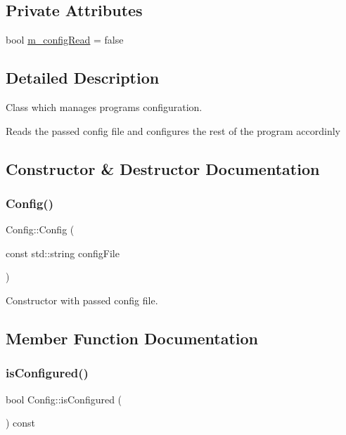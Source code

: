 \subsection*{Private Attributes}
\begin{DoxyCompactItemize}
\item 
bool \hyperlink{class_config_a82bcc998ae058699369aee4a189f0ad1}{m\+\_\+config\+Read} = false
\end{DoxyCompactItemize}


\subsection{Detailed Description}
Class which manages programs configuration. 

Reads the passed config file and configures the rest of the program accordinly 

\subsection{Constructor \& Destructor Documentation}
\mbox{\label{class_config_af8b0e9dc72b16b73ebb32d177fb93e1b}} 
\subsubsection{\texorpdfstring{Config()}{Config()}}
{\footnotesize\ttfamily Config\+::\+Config (\begin{DoxyParamCaption}\item[{const std\+::string}]{config\+File }\end{DoxyParamCaption})}



Constructor with passed config file. 



\subsection{Member Function Documentation}
\mbox{\label{class_config_a47870f3f5bc52f5d0aa387c25e431055}} 
\subsubsection{\texorpdfstring{is\+Configured()}{isConfigured()}}
{\footnotesize\ttfamily bool Config\+::is\+Configured (\begin{DoxyParamCaption}{ }\end{DoxyParamCaption}) const\hspace{0.3cm}{\ttfamily [inline]}}



